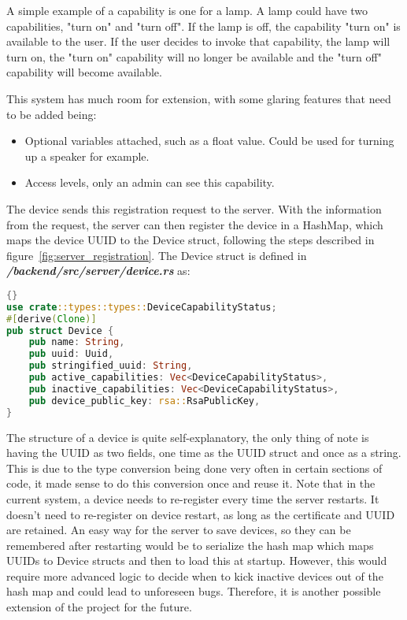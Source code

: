 A simple example of a capability is one for a lamp. A lamp could have two capabilities, "turn on" and "turn off". If the lamp is off, the capability "turn on" is available to the user. If the user decides to invoke that capability, the lamp will turn on, the "turn on" capability will no longer be available and the "turn off" capability will become available. 

This system has much room for extension, with some glaring features that need to be added being:
\begin{itemize}
    \item Optional variables attached, such as a float value. Could be used for turning up a speaker for example.
    \item Access levels, only an admin can see this capability.
\end{itemize}

The device sends this registration request to the server. With the information from the request, the server can then register the device in a HashMap, which maps the device UUID to the Device struct, following the steps described in figure~\ref{fig:server_registration}. The Device struct is defined in \textit{\textbf{/backend/src/server/device.rs}} as:
\begin{lstlisting}[language=Rust, style=boxed, showstringspaces=false]{}
use crate::types::types::DeviceCapabilityStatus;
#[derive(Clone)]
pub struct Device {
    pub name: String,
    pub uuid: Uuid,
    pub stringified_uuid: String,
    pub active_capabilities: Vec<DeviceCapabilityStatus>,
    pub inactive_capabilities: Vec<DeviceCapabilityStatus>,
    pub device_public_key: rsa::RsaPublicKey,
}
\end{lstlisting}
The structure of a device is quite self-explanatory, the only thing of note is having the UUID as two fields, one time as the UUID struct and once as a string. This is due to the type conversion being done very often in certain sections of code, it made sense to do this conversion once and reuse it.  
    Note that in the current system, a device needs to re-register every time the server restarts. It doesn't need to re-register on device restart, as long as the certificate and UUID are retained. An easy way for the server to save devices, so they can be remembered after restarting would be to serialize the hash map which maps UUIDs to Device structs and then to load this at startup. However, this would require more advanced logic to decide when to kick inactive devices out of the hash map and could lead to unforeseen bugs. Therefore, it is another possible extension of the project for the future.

